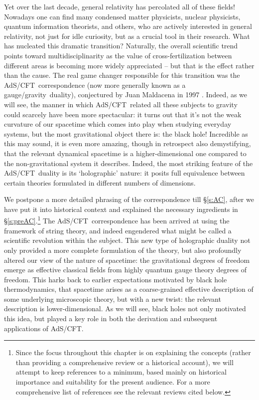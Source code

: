 \documentclass[12pt,a4paper]{article}
\def\sect#1{\S\ref{#1}}
\def\AC{AdS/CFT}
\def\GG{gauge/gravity}
\begin{document}
Yet over the last decade, general relativity has percolated all of these fields!  Nowadays one can find many condensed matter physicists, nuclear physicists, quantum information theorists, and others, who are actively interested in general relativity, not just for idle curiosity, but as a crucial tool in their research.  What has nucleated this dramatic transition?  Naturally,  the overall scientific trend points toward multidisciplinarity as the value of cross-fertilization between different areas is becoming more widely appreciated -- but that is the effect rather than the cause.  The real game changer responsible for this transition was the \AC\ correspondence (now more generally known as a \GG\ duality), conjectured by Juan Maldacena in 1997 \cite{Maldacena:1997re}.  Indeed, as we will see,  the manner in which \AC\ related all these subjects to gravity could scarcely have been more spectacular: it turns out that it's not the weak curvature of our spacetime which comes into play when studying everyday systems, but the most gravitational object there is: the black hole!  Incredible as this may sound, it is even more amazing, though in retrospect also demystifying, that the relevant dynamical spacetime is a higher-dimensional one compared to the non-gravitational system it describes.  Indeed, the most striking feature of the \AC\ duality is its `holographic' nature: it posits full equivalence between certain  theories formulated in different numbers of dimensions.

We postpone a more detailed phrasing of the correspondence till \sect{s:AC}, after we have put it into historical context and explained the necessary ingredients in \sect{s:preAC}.\footnote{
Since the focus throughout this chapter is on explaining the concepts (rather than providing a comprehensive review or a historical account), we will attempt to keep references to a minimum,  based mainly on historical importance and suitability for the present audience.  For a more comprehensive list of references see the relevant reviews cited below.
}  
The \AC\ correspondence has been arrived at using the framework of string theory, and indeed engendered what might be called  
a scientific revolution within the subject. 
This new type of holographic duality not only provided a more complete formulation of the theory,  but also profoundly altered our view of the nature of spacetime:  the gravitational degrees of freedom emerge  as effective classical fields from  highly quantum gauge theory degrees of freedom.  This harks back to earlier expectations motivated by black hole thermodynamics, that spacetime arises as a coarse-grained effective description of some underlying microscopic theory, but with a new twist: the relevant description is lower-dimensional.  As we will see, black holes not only motivated this idea, but played a key role in both the derivation and subsequent applications of \AC.
\end{document}
